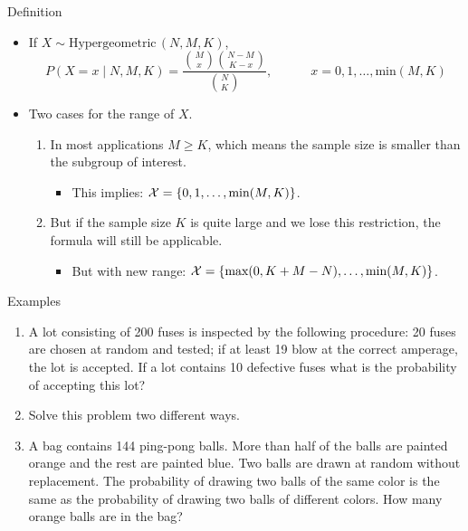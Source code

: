 \documentclass{article}
\newcommand{\follow}[1]{\sim \text{#1}\,}		%
\begin{document}
Definition\bigskip
\begin{itemize}
    \item If $X \follow{Hypergeometric}(N, M, K)$,
    \[P(X = x \mid N, M, K) = \frac{{M \choose x}{{N - M} \choose {K - x}}}{{N \choose K}}, \quad\quad\quad x = 0, 1, \ldots, \text{min}(M, K)\]\vspace{60pt}
    \item Two cases for the range of $X$.
    \begin{enumerate}
        \item In most applications $M \ge K$, which means the sample size is smaller than the subgroup of interest.
        \begin{itemize}
            \item This implies: ${\cal X} = \{0, 1, \ldots, \text{min}(M, K)\}$.
        \end{itemize}\bigskip
        \item But if the sample size $K$ is quite large and we lose this restriction, the formula will still be applicable.
        \begin{itemize}
            \item But with new range: ${\cal X} = \{\text{max}(0, K + M - N), \ldots, \text{min}(M, K)\}$.
        \end{itemize}\bigskip
    \end{enumerate}
\end{itemize}\bigskip

Examples\bigskip
\begin{enumerate}
    \item A lot consisting of 200 fuses is inspected by the following procedure: 20 fuses are chosen at random and tested; if at least 19 blow at the correct amperage, the lot is accepted. If a lot contains 10 defective fuses what is the probability of accepting this lot?
    \item[] Solve this problem two different ways.\vspace{150pt}
    \item A bag contains 144 ping-pong balls. More than half of the balls are painted orange and the rest are painted blue. Two balls are drawn at random without replacement. The probability of drawing two balls of the same color is the same as the probability of drawing two balls of different colors. How many orange balls are in the bag?\vspace{250pt} 
\end{enumerate}

\newpage
\end{document}
